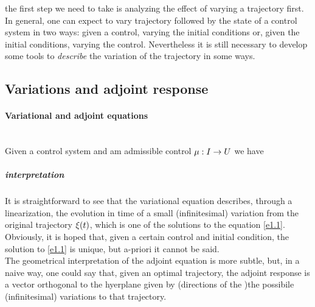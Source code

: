the first step we need to take is analyzing the effect of varying a trajectory first. In general, one can expect to vary trajectory followed by the state of a control system in two ways: given a control, varying the initial conditions or, given the initial conditions, varying the control. Nevertheless it is still necessary to develop some tools to \textit{describe} the variation of the trajectory in some ways. 



\subsection{Variations and adjoint response}


\paragraph{Variational and adjoint equations}\mbox{}\\
Given a control system \controlSystem and am admissible control $\mu:I\rightarrow U$ we have

\subparagraph{interpretation} It is straightforward to see that the variational equation describes, through a linearization,  the evolution in time of a small (infinitesimal) variation from the original trajectory $\xi (t)$, which is one of the solutions to the equation \ref{e1.1}.\\
Obviously, it is hoped that, given a certain control and initial condition, the solution to \ref{e1.1} is unique, but a-priori it cannot be said.\\
The geometrical interpretation of the adjoint equation is more subtle, but, in a naive way, one could say that, given an optimal trajectory, the adjoint response is a vector orthogonal to the hyerplane given by (directions of the )the possibile (infinitesimal) variations to that trajectory. 




